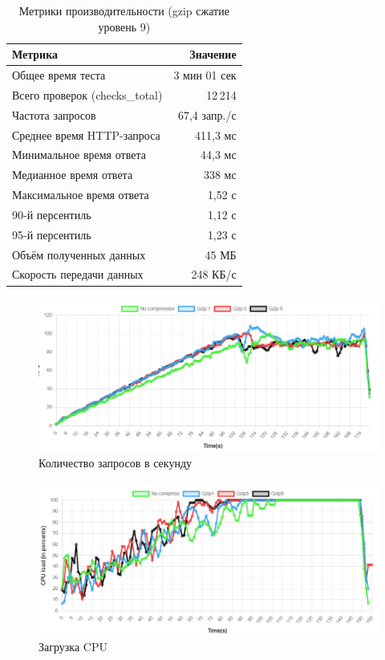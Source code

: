 \documentclass[12pt]{article}
\begin{document}
\begin{table}[h]
    \centering
    \caption{Метрики производительности (gzip сжатие уровень 9)}
    \begin{tabular}{lr}
        \toprule
        \textbf{Метрика}               & \textbf{Значение} \\
        \midrule
        Общее время теста              & 3 мин 01 сек      \\
        \hline
        Всего проверок (checks\_total) & 12\,214           \\
        Частота запросов               & 67,4 запр./с      \\
        \hline
        Среднее время HTTP-запроса     & 411,3 мс          \\
        Минимальное время ответа       & 44,3 мс           \\
        Медианное время ответа         & 338 мс            \\
        Максимальное время ответа      & 1,52 с            \\
        90-й персентиль                & 1,12 с            \\
        95-й персентиль                & 1,23 с            \\
        \hline
        Объём полученных данных        & 45 МБ             \\
        Скорость передачи данных       & 248 КБ/с          \\
        \bottomrule
    \end{tabular}
\end{table}
\begin{figure}[H]
    \centering
    \includegraphics[width=1\textwidth]{../images/second_part/RPS.png}
    \caption{Количество запросов в секунду}
\end{figure}

\begin{figure}[H]
    \centering
    \includegraphics[width=1\textwidth]{../images/second_part/CPU_load.png}
    \caption{Загрузка CPU}
\end{figure}
\end{document}
